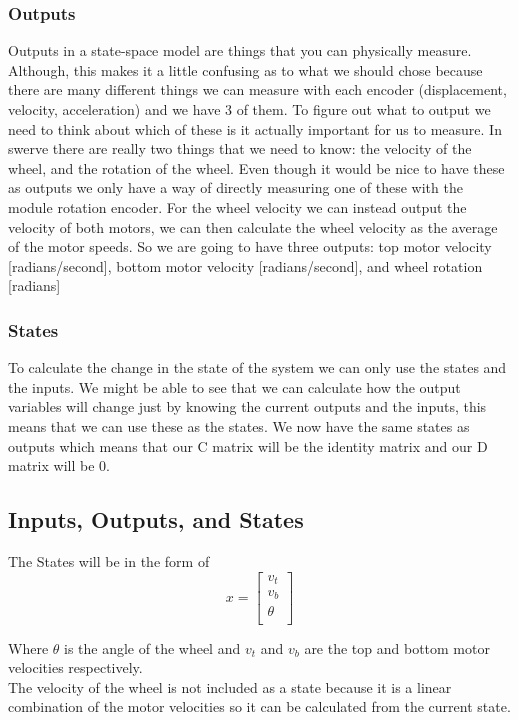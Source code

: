 \documentclass{scrartcl}
\begin{document}
\subsubsection*{Outputs}
Outputs in a state-space model are things that you can physically measure. Although, this makes it a little confusing as to what we should chose because there are many different things we can measure with each encoder (displacement, velocity, acceleration) and we have 3 of them. To figure out what to output we need to think about which of these is it actually important for us to measure.
In swerve there are really two things that we need to know: the velocity of the wheel, and the rotation of the wheel. Even though it would be nice to have these as outputs we only have a way of directly measuring one of these with the module rotation encoder. For the wheel velocity we can instead output the velocity of both motors, we can then calculate the wheel velocity as the average of the motor speeds.
So we are going to have three outputs: top motor velocity [radians/second], bottom motor velocity [radians/second], and wheel rotation [radians]

\subsubsection*{States}
To calculate the change in the state of the system we can only use the states and the inputs. We might be able to see that we can calculate how the output variables will change just by knowing the current outputs and the inputs, this means that we can use these as the states. We now have the same states as outputs which means that our C matrix will be the identity matrix and our D matrix will be 0.

\subsection{Inputs, Outputs, and States}
The States will be in the form of
\begin{equation}
    x =
    \begin{bmatrix}
        v_t    \\
        v_b    \\
        \theta \\
    \end{bmatrix}
\end{equation}

Where \(\theta\) is the angle of the wheel and \(v_t\) and \(v_b\) are the top and bottom motor velocities respectively. \\
The velocity of the wheel is not included as a state because it is a linear combination of the motor velocities so it can be calculated from the current state.
\end{document}

